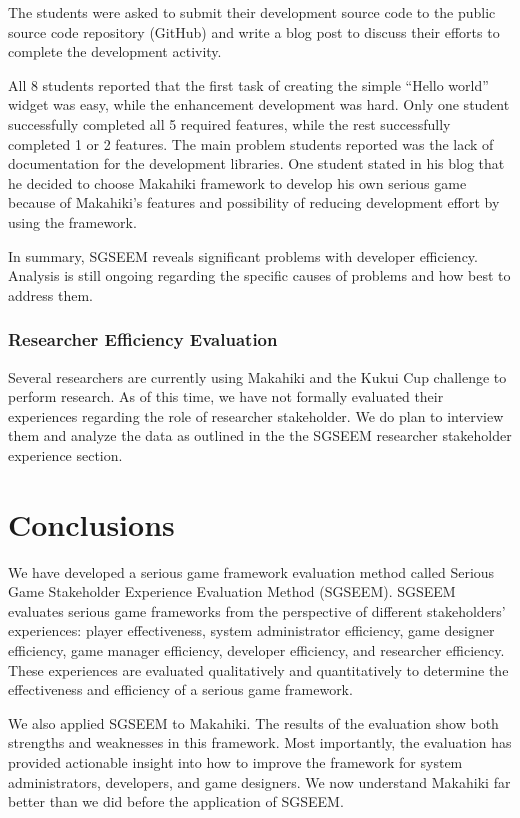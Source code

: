 \documentclass{sigchi}
\begin{document}
The students were asked to submit their development source code to the
public source code repository (GitHub) and write a blog post to
discuss their efforts to complete the development activity.

All 8 students reported that the first task of creating the simple ``Hello world'' widget
was easy, while the enhancement development was hard. Only one student successfully
completed all 5 required features, while the rest successfully completed 1 or 2
features. The main problem students reported was the lack of documentation for the
development libraries. One student stated in his blog that he decided to choose Makahiki
framework to develop his own serious game because of Makahiki's features and possibility
of reducing development effort by using the framework.

In summary, SGSEEM reveals significant problems with developer efficiency.
Analysis is still ongoing regarding the specific causes of problems and how best to
address them.

\subsubsection{Researcher Efficiency Evaluation}

Several researchers are currently using Makahiki and the Kukui Cup challenge to perform
research. As of this time, we have not formally evaluated their experiences regarding the
role of researcher stakeholder. We do plan to interview them and analyze the data as
outlined in the the SGSEEM researcher stakeholder experience section.

\section{Conclusions}

We have developed a serious game framework evaluation method called Serious Game
Stakeholder Experience Evaluation Method (SGSEEM). SGSEEM evaluates serious game
frameworks from the perspective of different stakeholders' experiences: player
effectiveness, system administrator efficiency, game designer efficiency, game manager
efficiency, developer efficiency, and researcher efficiency. These experiences are
evaluated qualitatively and quantitatively to determine the effectiveness and
efficiency of a serious game framework.

We also applied SGSEEM to Makahiki. The results of the evaluation show both strengths and
weaknesses in this framework.  Most importantly, the evaluation has provided actionable
insight into how to improve the framework for system administrators, developers, and game
designers.  We now understand Makahiki far better than we did before the application of
SGSEEM.
\end{document}
